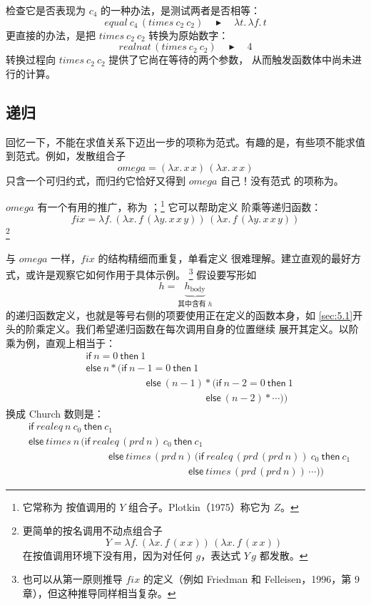 检查它是否表现为 \(c_4\) 的一种办法，是测试两者是否相等：
\[
 \mathit{equal}\ c_4\,(\mathit{times}\ c_2\ c_2)
 \quad\blacktriangleright\quad
 \lambda t.\,\lambda f.\,t
\]
更直接的办法，是把 \(\mathit{times}\ c_2\ c_2\) 转换为原始数字：
\[
 \mathit{realnat}\,(\mathit{times}\ c_2\ c_2)
 \quad\blacktriangleright\quad 4
\]
转换过程向 \(\mathit{times}\ c_2\ c_2\) 提供了它尚在等待的两个参数，
从而触发函数体中尚未进行的计算。

\subsection*{递归}

回忆一下，不能在求值关系下迈出一步的项称为范式。有趣的是，有些项不能求值
到范式。例如，发散组合子
\[
 \mathit{omega}=(\lambda x.\,x\,x)\,(\lambda x.\,x\,x)
\]
只含一个可归约式，而归约它恰好又得到 \(\mathit{omega}\) 自己！没有范式
的项称为。

\(\mathit{omega}\) 有一个有用的推广，称为
；\footnote{它常称为
按值调用的 \(Y\) 组合子。Plotkin（1975）称它为 \(Z\)。} 它可以帮助定义
阶乘等递归函数：
\[
 \mathit{fix}
 =\lambda f.\,
   (\lambda x.\,f\,(\lambda y.\,x\,x\,y))\,
   (\lambda x.\,f\,(\lambda y.\,x\,x\,y))
\]
\footnote{更简单的按名调用不动点组合子
\[
 Y=\lambda f.\,(\lambda x.\,f\,(x\,x))\,(\lambda x.\,f\,(x\,x))
\]
在按值调用环境下没有用，因为对任何 \(g\)，表达式 \(Y\,g\) 都发散。}

与 \(\mathit{omega}\) 一样，\(\mathit{fix}\) 的结构精细而重复，单看定义
很难理解。建立直观的最好方式，或许是观察它如何作用于具体示例。
\footnote{也可以从第一原则推导 \(\mathit{fix}\) 的定义（例如 Friedman 和
Felleisen，1996，第 9 章），但这种推导同样相当复杂。}
假设要写形如
\[
 h=\underbrace{h_{\mathrm{body}}}_{\text{其中含有 }h}
\]
的递归函数定义，也就是等号右侧的项要使用正在定义的函数本身，如
\cref{sec:5.1}开头的阶乘定义。我们希望递归函数在每次调用自身的位置继续
展开其定义。以阶乘为例，直观上相当于：
\[
\begin{aligned}
 &\mathsf{if}\ n=0\ \mathsf{then}\ 1\\
 &\mathsf{else}\ n*
   (\mathsf{if}\ n-1=0\ \mathsf{then}\ 1\\
 &\hspace{6em}\mathsf{else}\ (n-1)*
   (\mathsf{if}\ n-2=0\ \mathsf{then}\ 1\\
 &\hspace{12em}\mathsf{else}\ (n-2)*\cdots))
\end{aligned}
\]
换成 Church 数则是：
\[
\begin{aligned}
 &\mathsf{if}\ \mathit{realeq}\ n\ c_0\ \mathsf{then}\ c_1\\
 &\mathsf{else}\ \mathit{times}\ n\,
   (\mathsf{if}\ \mathit{realeq}\,(\mathit{prd}\ n)\ c_0\
     \mathsf{then}\ c_1\\
 &\hspace{8em}\mathsf{else}\ \mathit{times}\,(\mathit{prd}\ n)\,
   (\mathsf{if}\ \mathit{realeq}\,(\mathit{prd}\,(\mathit{prd}\ n))\ c_0\
     \mathsf{then}\ c_1\\
 &\hspace{16em}\mathsf{else}\ \mathit{times}\,
   (\mathit{prd}\,(\mathit{prd}\ n))\,\cdots))
\end{aligned}
\]

